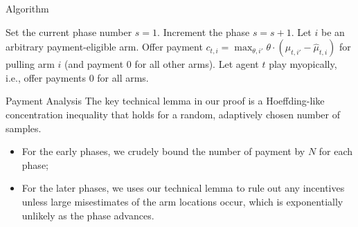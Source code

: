 \documentclass[serif]{beamer}
\begin{document}
\begin{frame}{Algorithm}

\begin{algorithmic}
\STATE Set the current phase number $s = 1$.
 {
\STATE Increment the phase $s = s + 1$.
\ENDIF
{} 
    \STATE Let $i$ be an arbitrary payment-eligible arm.
    \STATE Offer payment $c_{t,i} = \max_{\theta,i'} \theta \cdot (\hat{\mu}_{t,i'} - \hat{\mu}_{t,i})$ for pulling arm $i$ (and payment 0 for all other arms).
\ELSE
    \STATE Let agent $t$ play myopically, i.e., offer payments 0 for all arms.
\ENDIF 
}\ENDFOR
\end{algorithmic}

\end{frame}
\begin{frame}{Payment Analysis}
The key technical lemma in our proof is a Hoeffding-like concentration inequality that holds for a random, adaptively chosen number of samples.

\begin{itemize}[label=\textbullet]
\item For the early phases, we crudely bound the number of payment by $N$ for each phase;
\item For the later phases, we uses our technical lemma to rule out any incentives unless large misestimates of the arm locations occur, which is exponentially unlikely as the phase advances.
\end{itemize}
\end{frame}
\end{document}
